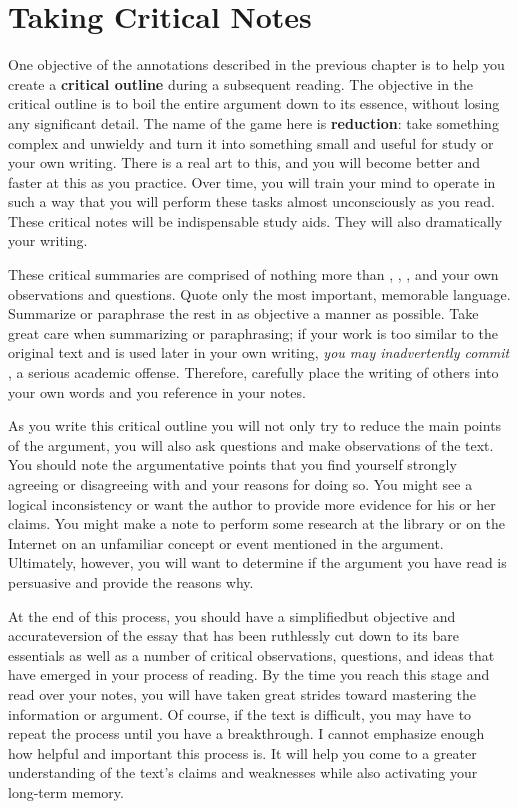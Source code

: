 \section{Taking Critical Notes}

One objective of the annotations described in the previous chapter is to help you create a \textbf{critical outline} during a subsequent reading. The objective in the critical
outline is to boil the entire argument down to its essence, without losing any
significant detail. The name of the game here is \textbf{reduction}: take
something complex and unwieldy and turn it into something small and useful for
study or your own writing. There is a real art to this, and you will become
better and faster at this as you practice. Over time, you will train your mind
to operate in such a way that you will perform these tasks almost unconsciously
as you read. These critical notes will be indispensable study aids. They will
also dramatically your writing.

These critical summaries are comprised of nothing more than \hyperlink{summary}{\color{Ahrenge}{summary}}, \hyperlink{paraphrase}{\color{Ahrenge}{paraphrase}}, \hyperlink{quotation}{\color{Ahrenge}{quotation}}, and your own observations and
questions. Quote only the most important, memorable language. Summarize or
paraphrase the rest in as objective a manner as possible. Take great care when
summarizing or paraphrasing; if your work is too similar to the original text
and is used later in your own writing, \emph{you may inadvertently commit
\hyperlink{plagiarism}{\color{Ahrenge}{plagiarism}}}, a serious academic
offense. Therefore, carefully place the writing of others into your own words
and \hyperlink{citation}{\color{Ahrenge}{cite the page numbers}} you reference in your notes.

As you write this critical outline you will not only try to reduce the main
points of the argument, you will also ask questions and make observations of the
text. You should note the argumentative points that you find yourself strongly
agreeing or disagreeing with and your reasons for doing so. You might see a
logical inconsistency or want the author to provide more evidence for his or her
claims. You might make a note to perform some research at the library or on the
Internet on an unfamiliar concept or event mentioned in the argument.
Ultimately, however, you will want to determine if the argument you have read is
persuasive and provide the reasons why.

At the end of this process, you should have a simplified\textemdash but
objective and accurate\textemdash version of the essay that has been ruthlessly
cut down to its bare essentials as well as a number of critical observations,
questions, and ideas that have emerged in your process of reading. By the time
you reach this stage and read over your notes, you will have taken great strides
toward mastering the information or argument. Of course, if the text is difficult, you may have to repeat the process until you have a breakthrough. I cannot emphasize enough how helpful and important this process is. It will help you come to a greater understanding of the text’s claims and weaknesses while also activating your long-term memory. 

